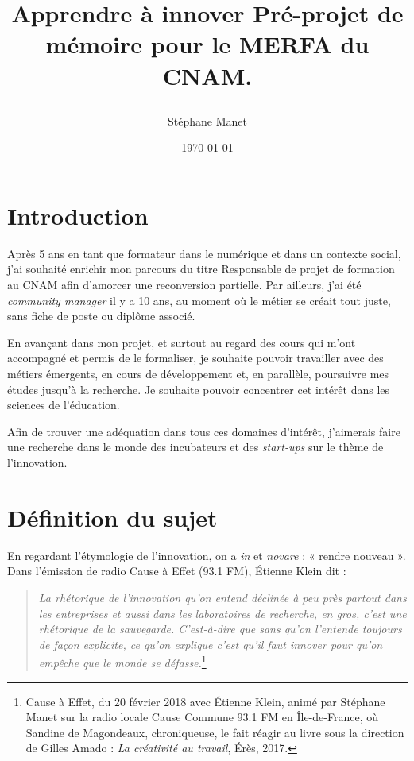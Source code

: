 \documentclass{article}
\author{Stéphane Manet}
\date{\today}
\title{%
    \begin{minipage}\linewidth
        \centering\bfseries
        Apprendre à innover
        \vskip3pt
        \large Pré-projet de mémoire pour le MERFA du CNAM.
    \end{minipage}
}
\begin{document}
\maketitle %
\tableofcontents


\section*{Introduction}

Après 5 ans en tant que formateur dans le numérique et dans un contexte social, j'ai souhaité enrichir mon parcours du titre Responsable de projet de formation au CNAM afin d'amorcer une reconversion partielle. 
Par ailleurs, j'ai été \emph{community manager} il y a 10 ans, au moment où le métier se créait tout juste, sans fiche de poste ou diplôme associé. 

En avançant dans mon projet, et surtout au regard des cours qui m'ont accompagné et permis de le formaliser, je souhaite pouvoir travailler avec des métiers émergents, en cours de développement et, en parallèle, poursuivre mes études jusqu'à la recherche. Je souhaite pouvoir concentrer cet intérêt dans les sciences de l'éducation.

Afin de trouver une adéquation dans tous ces domaines d'intérêt, j'aimerais faire une recherche dans le monde des incubateurs et des \emph{start-ups} sur le thème de l'innovation.

\section{Définition du sujet}

En regardant l'étymologie de l'innovation, on a \emph{in} et \emph{novare} : « rendre nouveau ». Dans l'émission de radio Cause à Effet (93.1 FM), Étienne Klein dit :

\begin{quote}
\textit{La rhétorique de l'innovation qu'on entend déclinée à peu près partout dans les entreprises et aussi dans les laboratoires de recherche, en gros, c'est une rhétorique de la sauvegarde. C'est-à-dire que sans qu'on l'entende toujours de façon explicite, ce qu'on explique c'est qu'il faut innover pour qu'on empêche que le monde se défasse.}\footnote{Cause à Effet, du 20 février 2018 avec Étienne Klein, animé par Stéphane Manet sur la radio locale Cause Commune 93.1 FM en Île-de-France, où Sandine de Magondeaux, chroniqueuse, le fait réagir au livre sous la direction de Gilles Amado : \emph{La créativité au travail}, Érès, 2017.}
\end{quote} 
\end{document}
